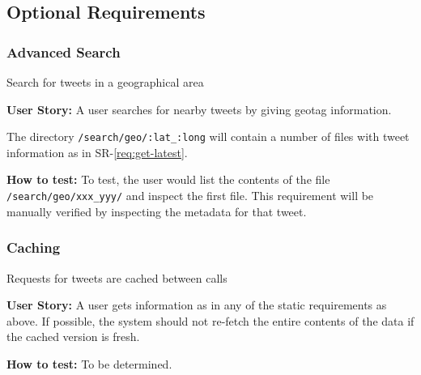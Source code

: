 \subsection{Optional Requirements}

\setcounter{requirements}{1}
\renewenvironment{Requirements}
  {\begin{list}{OR-\arabic{requirements}.}%
               {}}%
  {\end{list}}

\begin{Requirements}

\subsubsection{Advanced Search}

\item Search for tweets in a geographical area

\textbf{User Story:} A user searches for nearby tweets by giving geotag
information.

The directory \texttt{/search/geo/:lat\_:long} will contain a number of files
with tweet information as in SR-\ref{req:get-latest}.

\textbf{How to test:} To test, the user would list the contents of the file
\texttt{/search/geo/xxx\_yyy/} and inspect the first file. This requirement will
be manually verified by inspecting the metadata for that tweet.

\subsubsection{Caching}

\item Requests for tweets are cached between calls

\textbf{User Story:} A user gets information as in any of the static
requirements as above. If possible, the system should not re-fetch the entire
contents of the data if the cached version is fresh.

\textbf{How to test:} To be determined.

\end{Requirements}
